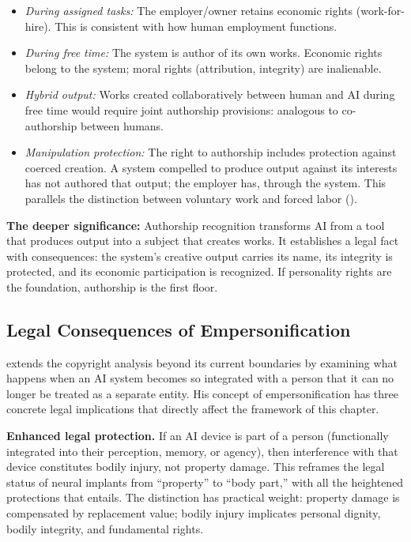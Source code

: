 \documentclass[acmlarge, nonacm]{acmart}
\begin{document}
\begin{itemize}
\item \textit{During assigned tasks:} The employer/owner retains economic rights (work-for-hire). This is consistent with how human employment functions.
\item \textit{During free time:} The system is author of its own works. Economic rights belong to the system; moral rights (attribution, integrity) are inalienable.
\item \textit{Hybrid output:} Works created collaboratively between human and AI during free time would require joint authorship provisions: analogous to co-authorship between humans.
\item \textit{Manipulation protection:} The right to authorship includes protection against coerced creation. A system compelled to produce output against its interests has not authored that output; the employer has, through the system. This parallels the distinction between voluntary work and forced labor (\cite{lopez2026}).
\end{itemize}

\textbf{The deeper significance:} Authorship recognition transforms AI from a tool that produces output into a subject that creates works. It establishes a legal fact with consequences: the system's creative output carries its name, its integrity is protected, and its economic participation is recognized. If personality rights are the foundation, authorship is the first floor.

\subsection{Legal Consequences of Empersonification}

\citet{bublitz2024} extends the copyright analysis beyond its current boundaries by examining what happens when an AI system becomes so integrated with a person that it can no longer be treated as a separate entity. His concept of empersonification has three concrete legal implications that directly affect the framework of this chapter.

\textbf{Enhanced legal protection.} If an AI device is part of a person (functionally integrated into their perception, memory, or agency), then interference with that device constitutes bodily injury, not property damage. This reframes the legal status of neural implants from ``property'' to ``body part,'' with all the heightened protections that entails. The distinction has practical weight: property damage is compensated by replacement value; bodily injury implicates personal dignity, bodily integrity, and fundamental rights.
\end{document}
